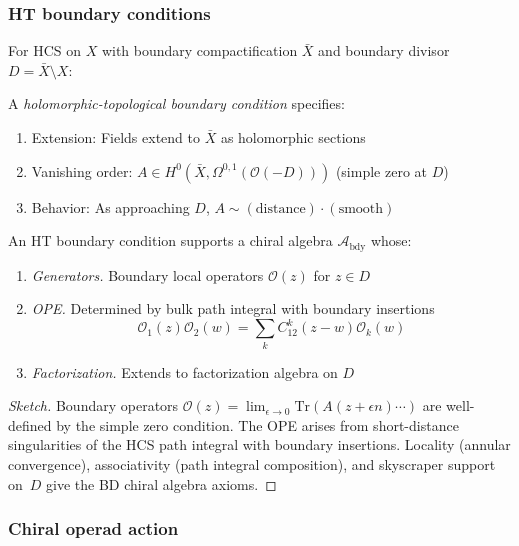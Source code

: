 \subsubsection{HT boundary conditions}

\begin{definition}
For HCS on $X$ with boundary compactification $\bar{X}$ and boundary divisor
$D = \bar{X} \setminus X$:

A \emph{holomorphic-topological boundary condition} specifies:
\begin{enumerate}
\item Extension: Fields extend to $\bar{X}$ as holomorphic sections
\item Vanishing order: $A \in H^0(\bar{X}, \Omega^{0,1}(\mathcal{O}(-D)))$ (simple zero at $D$)
\item Behavior: As approaching $D$, $A \sim (\text{distance}) \cdot (\text{smooth})$
\end{enumerate}
\end{definition}

\begin{theorem}
\label{thm:ht-boundary-chiral-algebra}
\cite{CDG20}
An HT boundary condition supports a chiral algebra $\mathcal{A}_{\text{bdy}}$ whose:
\begin{enumerate}
\item \emph{Generators.} Boundary local operators $\mathcal{O}(z)$ for $z \in D$
\item \emph{OPE.} Determined by bulk path integral with boundary insertions
\[\mathcal{O}_1(z) \mathcal{O}_2(w) = \sum_k C_{12}^k(z-w) \mathcal{O}_k(w)\]
\item \emph{Factorization.} Extends to factorization algebra on $D$
\end{enumerate}
\end{theorem}

\begin{proof}[Sketch]
Boundary operators $\mathcal{O}(z) = \lim_{\epsilon \to 0} \mathrm{Tr}(A(z + \epsilon n) \cdots)$ are well-defined by the simple zero condition. The OPE arises from short-distance singularities of the HCS path integral with boundary insertions. Locality (annular convergence), associativity (path integral composition), and skyscraper support on~$D$ give the BD chiral algebra axioms.
\end{proof}

\subsubsection{Chiral operad action}

